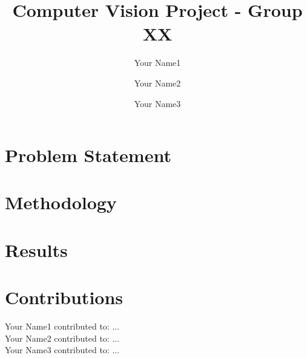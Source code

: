 \documentclass[10pt,twocolumn,letterpaper]{article}
\title{\textbf{Computer Vision Project - Group XX}}
\author{Your Name1 \and Your Name2 \and Your Name3}
\date{}
\begin{document}
\maketitle

\section{Problem Statement}

\section{Methodology}

\section{Results}

\section{Contributions}
Your Name1 contributed to: ... \\
Your Name2 contributed to: ... \\
Your Name3 contributed to: ...
\end{document}
